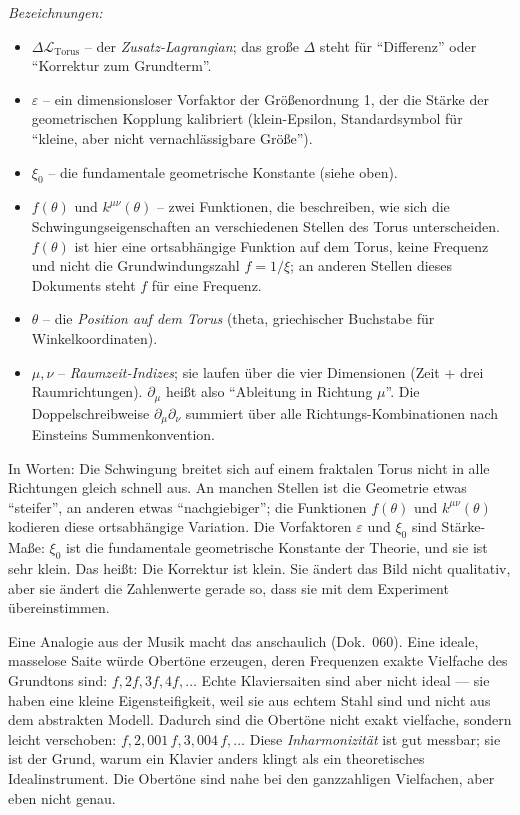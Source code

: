 \noindent\textit{Bezeichnungen:}
\begin{itemize}\setlength\itemsep{0pt}
  \item $\Delta\mathcal{L}_{\text{Torus}}$ -- der \emph{Zusatz-Lagrangian};
        das große $\Delta$ steht für \enquote{Differenz} oder
        \enquote{Korrektur zum Grundterm}.
  \item $\varepsilon$ -- ein dimensionsloser Vorfaktor der Größenordnung 1,
        der die Stärke der geometrischen Kopplung kalibriert (klein-Epsilon,
        Standardsymbol für \enquote{kleine, aber nicht vernachlässigbare Größe}).
  \item $\xi_0$ -- die fundamentale geometrische Konstante (siehe oben).
  \item $f(\theta)$ und $k^{\mu\nu}(\theta)$ -- zwei Funktionen, die
        beschreiben, wie sich die Schwingungseigenschaften an verschiedenen
        Stellen des Torus unterscheiden. $f(\theta)$ ist hier eine
        ortsabhängige Funktion auf dem Torus, keine Frequenz und nicht
        die Grundwindungszahl $f = 1/\xi$; an anderen Stellen dieses
        Dokuments steht $f$ für eine Frequenz.
  \item $\theta$ -- die \emph{Position auf dem Torus} (theta, griechischer
        Buchstabe für Winkelkoordinaten).
  \item $\mu, \nu$ -- \emph{Raumzeit-Indizes}; sie laufen über die vier
        Dimensionen (Zeit + drei Raumrichtungen). $\partial_\mu$ heißt
        also \enquote{Ableitung in Richtung $\mu$}. Die Doppelschreibweise
        $\partial_\mu\partial_\nu$ summiert über alle Richtungs-Kombinationen
        nach Einsteins Summenkonvention.
\end{itemize}

\medskip\noindent
In Worten: Die Schwingung breitet sich auf einem fraktalen Torus
nicht in alle Richtungen gleich schnell aus. An manchen Stellen ist
die Geometrie etwas \enquote{steifer}, an anderen etwas
\enquote{nachgiebiger}; die Funktionen $f(\theta)$ und
$k^{\mu\nu}(\theta)$ kodieren diese ortsabhängige Variation. Die
Vorfaktoren $\varepsilon$ und $\xi_0$ sind Stärke-Maße: $\xi_0$ ist
die fundamentale geometrische Konstante der Theorie, und sie ist
sehr klein. Das heißt: Die Korrektur ist klein. Sie ändert das
Bild nicht qualitativ, aber sie ändert die Zahlenwerte gerade so,
dass sie mit dem Experiment übereinstimmen.

Eine Analogie aus der Musik macht das anschaulich (Dok.~060). Eine
ideale, masselose Saite würde Obertöne erzeugen, deren Frequenzen
exakte Vielfache des Grundtons sind: $f, 2f, 3f, 4f, \ldots$ Echte
Klaviersaiten sind aber nicht ideal --- sie haben eine kleine
Eigensteifigkeit, weil sie aus echtem Stahl sind und nicht aus dem
abstrakten Modell. Dadurch sind die Obertöne nicht exakt vielfache,
sondern leicht verschoben: $f, 2{,}001\,f, 3{,}004\,f, \ldots$ Diese
\emph{Inharmonizität} ist gut messbar; sie ist der Grund, warum ein
Klavier anders klingt als ein theoretisches Idealinstrument. Die
Obertöne sind nahe bei den ganzzahligen Vielfachen, aber eben nicht
genau.

